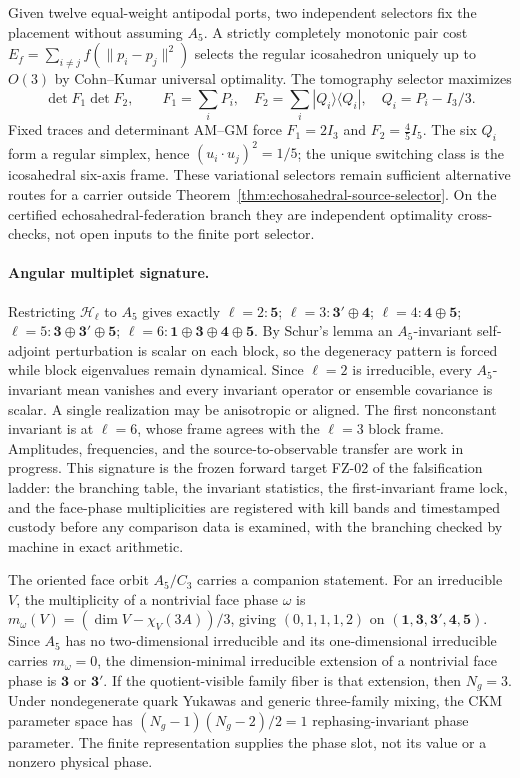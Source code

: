 \documentclass[11pt]{article}
\begin{document}
Given twelve equal-weight antipodal ports, two independent selectors fix the
placement without assuming \(A_5\). A strictly completely monotonic pair cost
\(E_f=\sum_{i\ne j}f(\|p_i-p_j\|^2)\) selects the regular icosahedron uniquely
up to \(O(3)\) by Cohn--Kumar universal optimality. The tomography selector
maximizes
\[
 \det F_1\det F_2,\qquad
 F_1=\sum_iP_i,\quad
 F_2=\sum_i|Q_i\rangle\langle Q_i|,\quad Q_i=P_i-I_3/3.
\]
Fixed traces and determinant AM--GM force \(F_1=2I_3\) and
\(F_2=\tfrac45I_5\). The six \(Q_i\) form a regular simplex, hence
\((u_i\cdot u_j)^2=1/5\); the unique switching class is the icosahedral
six-axis frame. These variational selectors remain sufficient alternative
routes for a carrier outside
Theorem~\ref{thm:echosahedral-source-selector}. On the certified
echosahedral-federation branch they are independent optimality cross-checks,
not open inputs to the finite port selector.

\paragraph{Angular multiplet signature.} Restricting \(\mathcal H_\ell\) to
\(A_5\) gives exactly
\(\ell=2:\mathbf5\); \(\ell=3:\mathbf3'\oplus\mathbf4\);
\(\ell=4:\mathbf4\oplus\mathbf5\);
\(\ell=5:\mathbf3\oplus\mathbf3'\oplus\mathbf5\);
\(\ell=6:\mathbf1\oplus\mathbf3\oplus\mathbf4\oplus\mathbf5\).
By Schur's lemma an \(A_5\)-invariant self-adjoint perturbation is scalar on
each block, so the degeneracy pattern is forced while block eigenvalues remain
dynamical. Since \(\ell=2\) is irreducible, every \(A_5\)-invariant mean
vanishes and every invariant operator or ensemble covariance is scalar. A
single realization may be anisotropic or aligned. The first nonconstant
invariant is at \(\ell=6\), whose frame agrees with the \(\ell=3\) block frame.
Amplitudes, frequencies, and the source-to-observable transfer are work in
progress. This signature is the frozen forward target FZ-02 of the
falsification ladder: the branching table, the invariant statistics, the
first-invariant frame lock, and the face-phase multiplicities are registered
with kill bands and timestamped custody before any comparison data is
examined, with the branching checked by machine in exact arithmetic.

The oriented face orbit \(A_5/C_3\) carries a companion statement. For an
irreducible \(V\), the multiplicity of a nontrivial face phase \(\omega\) is
\(m_\omega(V)=(\dim V-\chi_V(3A))/3\), giving \((0,1,1,1,2)\) on
\((\mathbf1,\mathbf3,\mathbf3',\mathbf4,\mathbf5)\). Since \(A_5\) has no
two-dimensional irreducible and its one-dimensional irreducible carries
\(m_\omega=0\), the dimension-minimal irreducible extension of a nontrivial
face phase is \(\mathbf3\) or \(\mathbf3'\). If the quotient-visible family
fiber is that extension, then \(N_g=3\). Under nondegenerate quark Yukawas and
generic three-family mixing, the CKM parameter space has
\((N_g-1)(N_g-2)/2=1\) rephasing-invariant phase parameter. The finite
representation supplies the phase slot, not its value or a nonzero physical
phase.
\end{document}
